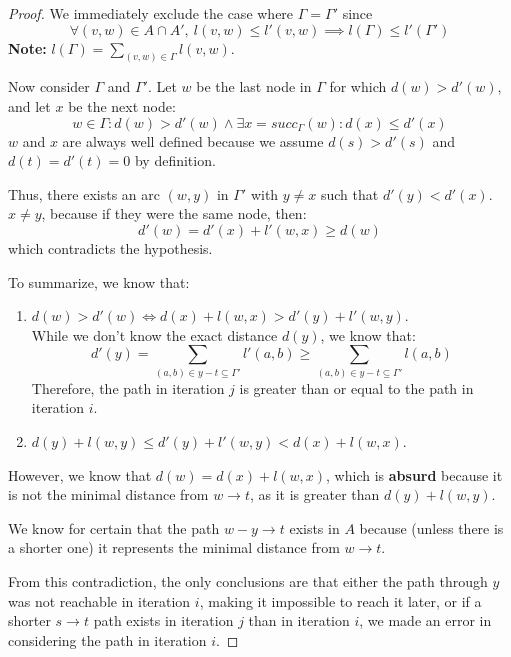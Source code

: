 \begin{proof}
We immediately exclude the case where \( \Gamma = \Gamma' \) since
        \[
        \forall (v,w) \in A \cap A',\ l(v,w) \le l'(v,w) \implies l(\Gamma) \le l'(\Gamma')
        \]
        \textbf{Note:} \( l(\Gamma) = \sum_{(v,w) \in \Gamma} l(v,w) \).

Now consider \( \Gamma \) and \( \Gamma' \). Let \( w \) be the last node in \( \Gamma \) for which \( d(w) > d'(w) \), and let \( x \) be the next node:
        \[
w \in \Gamma : d(w) > d'(w) \land \exists x = succ_{\Gamma}(w) : d(x) \le d'(x)
        \]
        \( w \) and \( x \) are always well defined because we assume \( d(s) > d'(s) \) and \( d(t) = d'(t) = 0 \) by definition.

Thus, there exists an arc \( (w,y) \) in \( \Gamma' \) with \( y \neq x \) such that \( d'(y) < d'(x) \). \( x \neq y \), because if they were the same node, then:
        \[
d'(w) = d'(x) + l'(w,x) \ge d(w)
        \]
which contradicts the hypothesis.

To summarize, we know that:
        \begin{enumerate}
            \item \( d(w) > d'(w) \iff d(x) + l(w,x) > d'(y) + l'(w,y) \). \\While we don't know the exact distance \( d(y) \), we know that:
        \[
d'(y) = \sum_{(a,b) \in y-t \subseteq \Gamma'} l'(a,b) \ge \sum_{(a,b) \in y-t \subseteq \Gamma'} l(a,b)
        \]
Therefore, the path in iteration \( j \) is greater than or equal to the path in iteration \( i \).
            \item \( d(y) + l(w,y) \le d'(y) + l'(w,y) < d(x) + l(w,x) \).
        \end{enumerate}

However, we know that \( d(w) = d(x) + l(w,x) \), which is \textbf{absurd} because it is not the minimal distance from \( w \rightarrow t \), as it is greater than \( d(y) + l(w,y) \).

We know for certain that the path \( w-y \rightarrow t \) exists in \( A \) because (unless there is a shorter one) it represents the minimal distance from \( w \rightarrow t \).

From this contradiction, the only conclusions are that either the path through \( y \) was not reachable in iteration \( i \), making it impossible to reach it later, or if a shorter \( s \rightarrow t \) path exists in iteration \( j \) than in iteration \( i \), we made an error in considering the path in iteration \( i \).

    

\end{proof}
